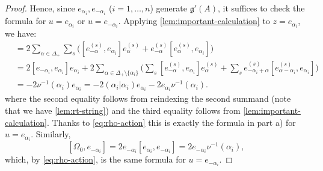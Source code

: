 \documentclass[12pt]{article}
\begin{document}
\begin{proof}
    Hence, since $e_{\alpha_i}, e_{-\alpha_i}$ ($i=1,\dots,n$) generate $\mathfrak{g}'(A)$, it suffices to check the formula for $u = e_{\alpha_i}$ or $u = e_{-\alpha_i}$. Applying \ref{lem:important-calculation} to $z = e_{\alpha_i}$, we have:
    \begin{align*}
        [\Omega_0,e_{\alpha_i}]
         & = 2 \sum_{\alpha \in \Delta_+} \sum_s \big([e_{-\alpha}^{(s)},e_{\alpha_i}]e_\alpha^{(s)} + e_{-\alpha}^{(s)}[e_\alpha^{(s)},e_{\alpha_i}]\big)                                                  \\
         & = 2[e_{-\alpha_i},e_{\alpha_i}]e_{\alpha_i}
        + 2 \sum_{\alpha \in \Delta_+ \setminus \{\alpha_i\}} \bigg(\sum_s [e_{-\alpha}^{(s)},e_{\alpha_i}]e_\alpha^{(s)} + \sum_s e_{-\alpha_i+\alpha}^{(s)}[e_{\alpha-\alpha_i}^{(s)},e_{\alpha_i}]\bigg) \\
         & = -2\nu^{-1}(\alpha_i)e_{\alpha_i}
        = -2(\alpha_i|\alpha_i)e_{\alpha_i} - 2e_{\alpha_i}\nu^{-1}(\alpha_i).
    \end{align*}
    where the second equality follows from reindexing the second summand (note that we have \ref{lem:rt-string}) and the third equality follows from \ref{lem:important-calculation}.
    Thanks to \ref{eq:rho-action} this is exactly the formula in part a) for $u = e_{\alpha_i}$. Similarly,
    \[
        [\Omega_0,e_{-\alpha_i}] = 2e_{-\alpha_i}[e_{\alpha_i},e_{-\alpha_i}]
        = 2e_{-\alpha_i}\nu^{-1}(\alpha_i),
    \]
    which, by \ref{eq:rho-action}, is the same formula for $u = e_{-\alpha_i}$.
\end{proof}
\end{document}
